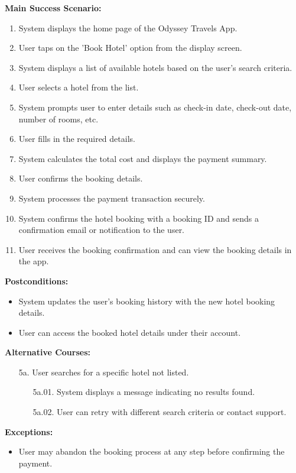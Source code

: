 \documentclass{scrreprt}
\begin{document}
\textbf{Main Success Scenario:}
\begin{enumerate}
    \item System displays the home page of the Odyssey Travels App.
    \item User taps on the 'Book Hotel' option from the display screen.
    \item System displays a list of available hotels based on the user's search criteria.
    \item User selects a hotel from the list.
    \item System prompts user to enter details such as check-in date, check-out date, number of rooms, etc.
    \item User fills in the required details.
    \item System calculates the total cost and displays the payment summary.
    \item User confirms the booking details.
    \item System processes the payment transaction securely.
    \item System confirms the hotel booking with a booking ID and sends a confirmation email or notification to the user.
    \item User receives the booking confirmation and can view the booking details in the app.
\end{enumerate}

\textbf{Postconditions:}
\begin{itemize}
    \item System updates the user's booking history with the new hotel booking details.
    \item User can access the booked hotel details under their account.
\end{itemize}

\textbf{Alternative Courses:}
\begin{itemize}
    \item[5a.] User searches for a specific hotel not listed.
    \begin{itemize}
        \item[5a.01.] System displays a message indicating no results found.
        \item[5a.02.] User can retry with different search criteria or contact support.
    \end{itemize}
\end{itemize}

\textbf{Exceptions:}
\begin{itemize}
    \item User may abandon the booking process at any step before confirming the payment.
\end{itemize}
\end{document}
